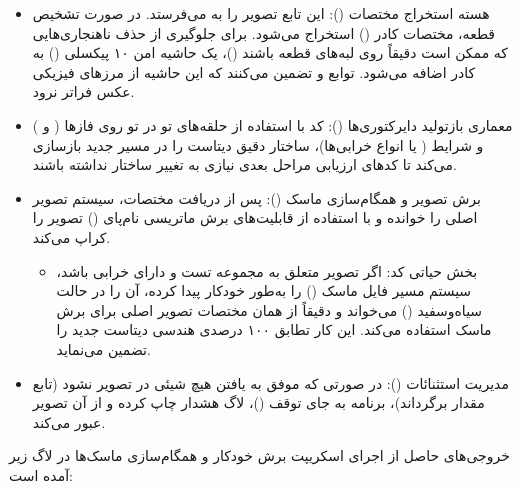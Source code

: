 \documentclass{article}
\begin{document}
\begin{itemize}
	
	\item هسته استخراج مختصات (): این تابع تصویر را به  می‌فرستد. در صورت تشخیص قطعه، مختصات کادر () استخراج می‌شود. برای جلوگیری از حذف ناهنجاری‌هایی که ممکن است دقیقاً روی لبه‌های قطعه باشند ()، یک حاشیه امن ۱۰ پیکسلی () به کادر اضافه می‌شود. توابع  و  تضمین می‌کنند که این حاشیه از مرزهای فیزیکی عکس فراتر نرود.
	
	\item معماری بازتولید دایرکتوری‌ها (): کد با استفاده از حلقه‌های تو در تو روی فازها ( و ) و شرایط ( یا انواع خرابی‌ها)، ساختار دقیق دیتاست  را در مسیر جدید  بازسازی می‌کند تا کدهای ارزیابی مراحل بعدی نیازی به تغییر ساختار نداشته باشند.
	
	\item برش تصویر و همگام‌سازی ماسک (): پس از دریافت مختصات، سیستم تصویر اصلی را خوانده و با استفاده از قابلیت‌های برش ماتریسی نام‌پای () تصویر را کراپ می‌کند.
	\begin{itemize}
		\item بخش حیاتی کد: اگر تصویر متعلق به مجموعه تست و دارای خرابی باشد، سیستم مسیر فایل ماسک () را به‌طور خودکار پیدا کرده، آن را در حالت سیاه‌وسفید () می‌خواند و دقیقاً از همان مختصات تصویر اصلی برای برش ماسک استفاده می‌کند. این کار تطابق ۱۰۰ درصدی هندسی دیتاست جدید را تضمین می‌نماید.
	\end{itemize}
	
	\item مدیریت استثنائات (): در صورتی که  موفق به یافتن هیچ شیئی در تصویر نشود (تابع  مقدار  برگرداند)، برنامه به جای توقف ()، لاگ هشدار چاپ کرده و از آن تصویر عبور می‌کند.
\end{itemize}
خروجی‌های حاصل از اجرای اسکریپت برش خودکار و همگام‌سازی ماسک‌ها در لاگ زیر آمده است:
\end{document}
